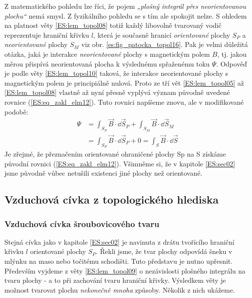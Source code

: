       Z matematického pohledu lze říci, že pojem \emph{„plošný integrál přes neorientovanou 
      plochu“} nemá smysl. Z fyzikálního pohledu se s tím ale spokojit nelze. S ohledem na platnost 
      věty \ref{ES:lem_topol08} totiž každý libovolně tvarovaný vodič reprezentuje hraniční křivku 
      \(l\), která je současně hranicí \emph{orientované} plochy \(S_P\) a \emph{neorientované} 
      plochy \(S_M\) viz obr. \ref{es:fig_patocka_topol16}. Pak je velmi důležitá otázka, jaká je 
      interakce \emph{neorientované} plochy s magnetickým polem \(B\), tj. jakou měrou přispívá 
      neorientovaná plocha k výslednému spřaženému toku \(\Psi\). Odpověď je podle věty 
      \ref{ES:lem_topol10} taková, že interakce neorientované plochy s magnetickým polem je 
      principiálně nulová. Proto ze tří vět \ref{ES:lem_topol05} až \ref{ES:lem_topol08} vlastně až 
      nyní přesně vyplývá význam původně uvedené rovnice (\ref{ES:eq_zakl_elm12}). Tuto rovnici 
      napíšeme znovu, ale v modifikované podobě:
      \begin{align}\label{ES:eq_topol18}
        \Psi &= \int_{S_P}\vec{B}\cdot \dd{\vec{S}}_P + \int_{S_M}\vec{B}\cdot \dd{\vec{S}}_M \nonumber \\
             &= \int_{S_P}\vec{B}\cdot \dd{\vec{S}}_P + 0 
              = \int_{S}\vec{B}\cdot \dd{\vec{S}}
      \end{align}
      Je zřejmé, že přeznačením orientované ohraničené plochy Sp na S získáme původní rovnici 
      (\ref{ES:eq_zakl_elm12}). Všimněme si, že v kapitole \ref{ES:sec02} jsme původně vůbec 
      netušili existenci jiné plochy než orientované.
    
    \subsection{Vzduchová cívka z topologického hlediska}\label{teo:IchapIIsecIIsubV}
      \subsubsection{Vzduchová cívka šroubovicového tvaru}        
        Stejná cívka jako v kapitole \ref{ES:sec02} je navinuta z drátu tvořícího hraniční křivku 
        \(l\) orientované plochy \(S_P\). Řekli jsme, že tvar plochy odpovídá šneku v mlýnku na 
        maso nebo točitému schodišti. Tuto představu je nutno upřesnit. Především vyjdeme z věty 
        \ref{ES:lem_topol09} o nezávislosti plošného integrálu na tvaru plochy - a to při zachování 
        tvaru hraniční křivky. Výsledkem věty je možnost tvarovat plochu \emph{nekonečně mnoha} 
        způsoby. Několik z nich ukážeme.

